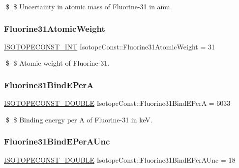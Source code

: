 \$ \$ Uncertainty in atomic mass of Fluorine-\/31 in amu. \mbox{\label{group___isotope_const-_fluorine-_f31_ga704786215b7a9b4dbef0723d32327a66}} 
\subsubsection{\texorpdfstring{Fluorine31\+Atomic\+Weight}{Fluorine31AtomicWeight}}
{\footnotesize\ttfamily \mbox{\hyperlink{group___isotope_const-_macros_ga5f18360b3e99483a35c32d789e62621c}{I\+S\+O\+T\+O\+P\+E\+C\+O\+N\+S\+T\+\_\+\+I\+NT}} Isotope\+Const\+::\+Fluorine31\+Atomic\+Weight = 31}

\$ \$ Atomic weight of Fluorine-\/31. \mbox{\label{group___isotope_const-_fluorine-_f31_ga59cc6453af590dd2fe8c74cc0df6cbf4}} 
\subsubsection{\texorpdfstring{Fluorine31\+Bind\+E\+PerA}{Fluorine31BindEPerA}}
{\footnotesize\ttfamily \mbox{\hyperlink{group___isotope_const-_macros_ga8f45a7272ce02c0b4c65c44636ed719a}{I\+S\+O\+T\+O\+P\+E\+C\+O\+N\+S\+T\+\_\+\+D\+O\+U\+B\+LE}} Isotope\+Const\+::\+Fluorine31\+Bind\+E\+PerA = 6033}

\$ \$ Binding energy per A of Fluorine-\/31 in keV. \mbox{\label{group___isotope_const-_fluorine-_f31_ga9a9df1c16e80b18b9efbf766866b9d0c}} 
\subsubsection{\texorpdfstring{Fluorine31\+Bind\+E\+Per\+A\+Unc}{Fluorine31BindEPerAUnc}}
{\footnotesize\ttfamily \mbox{\hyperlink{group___isotope_const-_macros_ga8f45a7272ce02c0b4c65c44636ed719a}{I\+S\+O\+T\+O\+P\+E\+C\+O\+N\+S\+T\+\_\+\+D\+O\+U\+B\+LE}} Isotope\+Const\+::\+Fluorine31\+Bind\+E\+Per\+A\+Unc = 18}

